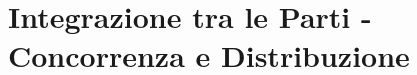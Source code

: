 \documentclass[aps,letterpaper,10pt]{article}
\begin{document}
\newpage

\section{Integrazione tra le Parti - Concorrenza e Distribuzione}

\end{document}
